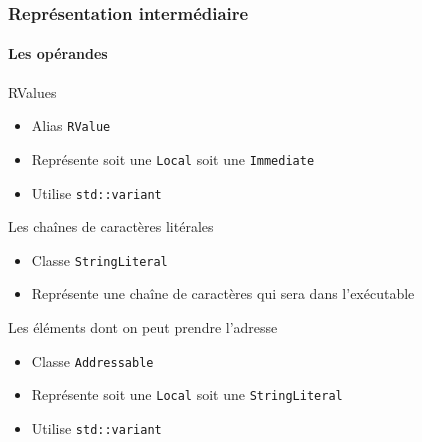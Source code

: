 \documentclass{beamer}
\begin{document}
\begin{frame}
    \frametitle{Représentation intermédiaire}
    \framesubtitle{Les opérandes}

    \begin{block}{RValues}
        \begin{itemize}
            \item Alias \lstinline{RValue}
            \item Représente soit une \lstinline{Local} soit une \lstinline{Immediate}
            \item Utilise \lstinline{std::variant}
        \end{itemize}
    \end{block}
    \pause
    \begin{block}{Les chaînes de caractères litérales}
        \begin{itemize}
            \item Classe \lstinline{StringLiteral}
            \item Représente une chaîne de caractères qui sera dans l'exécutable
        \end{itemize}
    \end{block}
    \pause
    \begin{block}{Les éléments dont on peut prendre l'adresse}
        \begin{itemize}
            \item Classe \lstinline{Addressable}
            \item Représente soit une \lstinline{Local} soit une \lstinline{StringLiteral}
            \item Utilise \lstinline{std::variant}
        \end{itemize}
        
    \end{block}

\end{frame}
\end{document}
